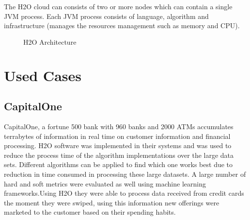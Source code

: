 \documentclass[9pt,twocolumn,twoside]{../../styles/osajnl}
\begin{document}
The H2O cloud can consists of two or more nodes
which can contain a single JVM process. Each JVM process consists of
language, algorithm and infrastructure (manages the resources
management such as memory and CPU)\cite{www-h2o-architecture}.

\begin{figure}[htbp]
\centering
{}
\caption{H2O Architecture\cite{www-h2o-architecture}}
\label{ fig:Architecture of H2O}
\end{figure}


\section {Used Cases}


\subsection {CapitalOne}

CapitalOne, a fortune 500 bank with 960 banks and 2000 ATMs
accumulates terrabytes of information in real time on customer
information and financial processing. H2O software was implemented in their systems and  was used to reduce the
process time of the algorithm implementations over the large data sets\cite{www-h2o-capitalone}. Different algorithms can be applied to find which one
works best due to reduction in time consumed in processing these large
datasets. A large number of hard and soft metrics were evaluated as
well using machine learning frameworks\cite{www-h2o-capitalone}.Using H2O they were able to process data received from credit cards the moment they were swiped, using this information new offerings were marketed to the customer based on their spending habits.
\end{document}
